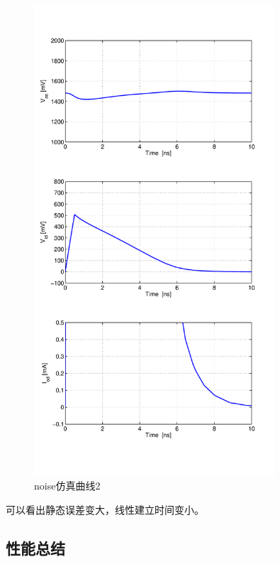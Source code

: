 \documentclass[a4paper]{article}
\begin{document}
\begin{figure}[htb]
    \begin{center}
        \includegraphics[width=0.8\textwidth]{fast/tran2.pdf}
    \end{center}
    \caption{noise仿真曲线2}
    \label{fasttran2}
\end{figure}
可以看出静态误差变大，线性建立时间变小。

\newpage
\clearpage
\subsection{性能总结}
\end{document}

